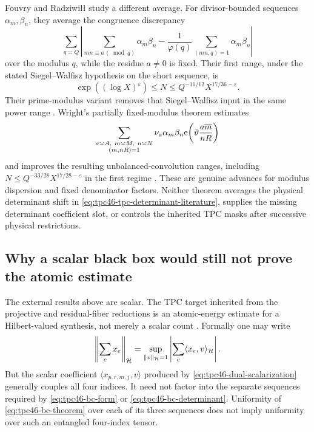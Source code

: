 Fouvry and Radziwi\l\l{} study a different average.  For divisor-bounded
sequences \(\alpha_m,\beta_n\), they average the congruence discrepancy
\begin{equation}
 \sum_{q\asymp Q}
 \left|
 \sum_{mn\equiv a\, (\bmod q)}\alpha_m\beta_n
 -\frac1{\varphi(q)}
 \sum_{(mn,q)=1}\alpha_m\beta_n
 \right|
 \label{eq:tpc46-fr-discrepancy}
\end{equation}
over the modulus \(q\), while the residue \(a\ne0\) is fixed.  Their
first range, under the stated Siegel--Walfisz hypothesis on the short
sequence, is
\begin{equation}
 \exp((\log X)^\varepsilon)
 \le N
 \le Q^{-11/12}X^{17/36-\varepsilon}.
 \label{eq:tpc46-fr-range}
\end{equation}
Their prime-modulus variant removes that Siegel--Walfisz input in the
same power range \citep[Corollary~1.1 and Theorem~1.2]{FR2022}.
Wright's partially fixed-modulus theorem estimates
\begin{equation}
 \sum_{\substack{a\asymp A,\ m\asymp M,\ n\asymp N\\(m,nR)=1}}
 \nu_a\alpha_m\beta_n
 \mathrm e\!\left(\vartheta\frac{a\overline m}{nR}\right)
 \label{eq:tpc46-wright-form}
\end{equation}
and improves the resulting unbalanced-convolution ranges, including
\(N\le Q^{-33/28}X^{17/28-\varepsilon}\) in the first regime
\citep[Theorem~2.1 and Corollary~2.2]{Wright2026}.  These are genuine
advances for modulus dispersion and fixed denominator factors.  Neither
theorem averages the physical determinant shift in
\eqref{eq:tpc46-tpc-determinant-literature}, supplies the missing
determinant coefficient slot, or controls the inherited TPC masks after
successive physical restrictions.

\subsection{Why a scalar black box would still not prove the atomic estimate}
\label{subsec:tpc46-vector-boundary}

The external results above are scalar.  The TPC target inherited from
the projective and residual-fiber reductions is an atomic-energy
estimate for a Hilbert-valued synthesis, not merely a scalar count
\citep{WangTPC36,WangTPC42,WangTPC43,WangTPC45}.  Formally one may
write
\begin{equation}
 \left\|\sum_e x_e\right\|_{\mathcal H}
 =\sup_{\|v\|_{\mathcal H}=1}
 \left|\sum_e\langle x_e,v\rangle_{\mathcal H}\right|.
 \label{eq:tpc46-dual-scalarization}
\end{equation}
But the scalar coefficient \(\langle x_{p,r,m,j},v\rangle\) produced
by \eqref{eq:tpc46-dual-scalarization} generally couples all four
indices.  It need not factor into the separate sequences required by
\eqref{eq:tpc46-bc-form} or \eqref{eq:tpc46-bc-determinant}.  Uniformity
of \eqref{eq:tpc46-bc-theorem} over each of its three sequences does not
imply uniformity over such an entangled four-index tensor.

